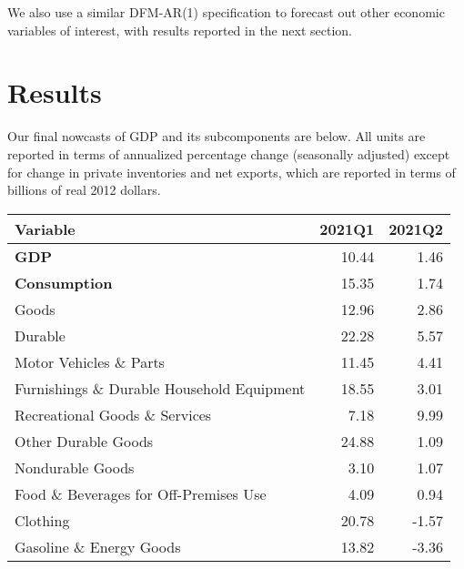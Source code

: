 \documentclass[11pt, letterpaper]{article}\usepackage[]{graphicx}\usepackage[]{color}
\begin{document}
We also use a similar DFM-AR(1) specification to forecast out other economic variables of interest, with results reported in the next section.


\section{Results}
Our final nowcasts of GDP and its subcomponents are below. All units are reported in terms of annualized percentage change (seasonally adjusted) except for change in private inventories and net exports, which are reported in terms of billions of real 2012 dollars.
\begin{table}[H]
\centering
\begingroup\fontsize{10pt}{12pt}\selectfont
\begin{tabular}{lrr}
  \hline
Variable & 2021Q1 & 2021Q2 \\ 
  \hline
\hspace{0mm} \textbf{GDP} & 10.44 & 1.46 \\ 
  \hspace{0mm} \textbf{Consumption} & 15.35 & 1.74 \\ 
  \hspace{8mm}  Goods & 12.96 & 2.86 \\ 
  \hspace{16mm}  Durable & 22.28 & 5.57 \\ 
  \hspace{24mm}  Motor Vehicles \& Parts & 11.45 & 4.41 \\ 
  \hspace{24mm}  Furnishings \& Durable Household Equipment & 18.55 & 3.01 \\ 
  \hspace{24mm}  Recreational Goods \& Services & 7.18 & 9.99 \\ 
  \hspace{24mm}  Other Durable Goods & 24.88 & 1.09 \\ 
  \hspace{16mm}  Nondurable Goods & 3.10 & 1.07 \\ 
  \hspace{24mm}  Food \& Beverages for Off-Premises Use & 4.09 & 0.94 \\ 
  \hspace{24mm}  Clothing & 20.78 & -1.57 \\ 
  \hspace{24mm}  Gasoline \& Energy Goods & 13.82 & -3.36 \\ 

\end{tabular}
\end{table}
\end{document}
